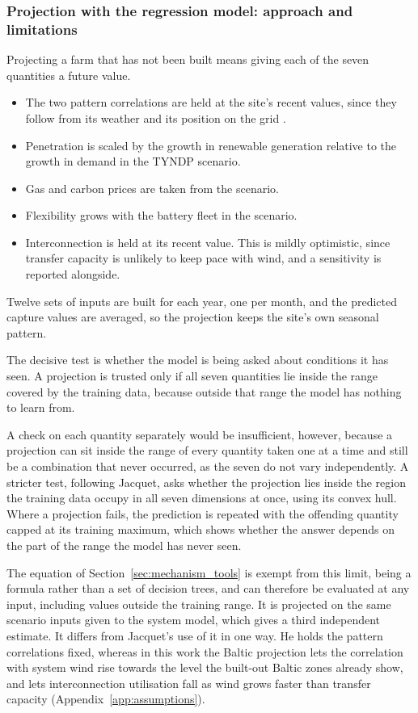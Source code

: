\subsubsection{Projection with the regression model: approach and limitations}
\label{sec:reg_projection}

Projecting a farm that has not been built means giving each of the seven
quantities a future value.

\begin{itemize}
    \item The two pattern correlations are held at the site's recent values,
    since they follow from its weather and its position on the grid
    \cite{Jacquet2024}.
    \item Penetration is scaled by the growth in renewable generation relative
    to the growth in demand in the TYNDP scenario.
    \item Gas and carbon prices are taken from the scenario.
    \item Flexibility grows with the battery fleet in the scenario.
    \item Interconnection is held at its recent value. This is mildly optimistic,
    since transfer capacity is unlikely to keep pace with wind, and a
    sensitivity is reported alongside.
\end{itemize}

Twelve sets of inputs are built for each year, one per month, and the predicted
capture values are averaged, so the projection keeps the site's own seasonal
pattern.

The decisive test is whether the model is being asked about conditions it has
seen. A projection is trusted only if all seven quantities lie inside the range
covered by the training data, because outside that range the model has nothing
to learn from.

A check on each quantity separately would be insufficient, however, because a
projection can sit inside the range of every quantity taken one at a time and
still be a combination that never occurred, as the seven do not vary
independently. A stricter test,
following Jacquet, asks whether the projection lies inside the region the
training data occupy in all seven dimensions at once, using its convex
hull. Where a projection fails, the prediction is repeated with the offending
quantity capped at its training maximum, which shows whether the answer depends
on the part of the range the model has never seen.

The equation of Section~\ref{sec:mechanism_tools} is exempt from this limit,
being a formula rather than a set of decision trees, and can therefore be
evaluated at any input, including values outside the
training range. It is projected on the same scenario inputs given to the system
model, which gives a third independent estimate. It differs from Jacquet's use
of it in one way. He holds the pattern correlations fixed, whereas in this work the
Baltic projection lets the correlation with system wind rise towards the level
the built-out Baltic zones already show, and lets interconnection utilisation
fall as wind grows faster than transfer capacity
(Appendix~\ref{app:assumptions}).

